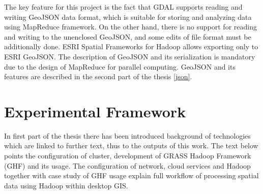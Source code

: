 \documentclass[a4paper,12pt,oneside]{report}
\begin{document}
	The key feature for this project is the fact that GDAL supports reading and writing GeoJSON data
	format, which is suitable for storing and analyzing data using MapReduce framework. On the other hand, there is no support for reading and writing to the unenclosed GeoJSON, and some edits of file format must be additionally done. 
	ESRI Spatial Frameworks for Hadoop allows exporting only to ESRI GeoJSON. The description of
	GeoJSON and its serialization is mandatory due to the design of MapReduce 
	for parallel computing. GeoJSON and its features are described in the second
	part of the thesis \ref{json}.
	
	
	
	
	
	\newpage
	\chapter*{Experimental Framework}
	In first part of the thesis there has been introduced background of technologies which are 
	linked to further text, thus to the outputs  of this work. The text below points the 
	configuration of cluster, development of GRASS Hadoop Framework (GHF) and its usage.
	The configuration of network, cloud services and Hadoop together with case study of 
	GHF usage explain full workflow of processing spatial data using Hadoop within desktop GIS.
	
\end{document}
